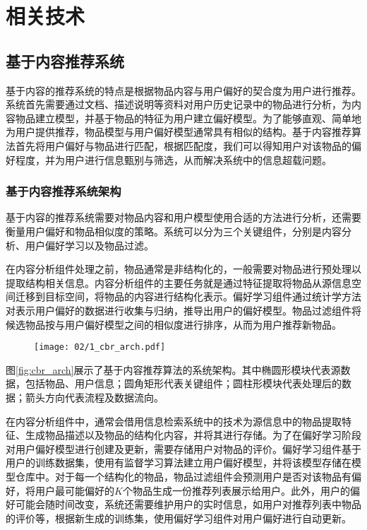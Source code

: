 \chapter{相关技术}
\label{chap:related}

\section{基于内容推荐系统}

基于内容的推荐系统的特点是根据物品内容与用户偏好的契合度为用户进行推荐\cite{lops2011content}。系统首先需要通过文档、描述说明等资料对用户历史记录中的物品进行分析，为内容物品建立模型，并基于物品的特征为用户建立偏好模型。为了能够直观、简单地为用户提供推荐，物品模型与用户偏好模型通常具有相似的结构。基于内容推荐算法首先将用户偏好与物品进行匹配，根据匹配度，我们可以得知用户对该物品的偏好程度，并为用户进行信息甄别与筛选，从而解决系统中的信息超载问题。

\subsection{基于内容推荐系统架构}
基于内容的推荐系统需要对物品内容和用户模型使用合适的方法进行分析，还需要衡量用户偏好和物品相似度的策略。系统可以分为三个关键组件，分别是内容分析、用户偏好学习以及物品过滤。

在内容分析组件处理之前，物品通常是非结构化的，一般需要对物品进行预处理以提取结构相关信息。内容分析组件的主要任务就是通过特征提取将物品从源信息空间迁移到目标空间，将物品的内容进行结构化表示。偏好学习组件通过统计学方法对表示用户偏好的数据进行收集与归纳，推导出用户的偏好模型。物品过滤组件将候选物品按与用户偏好模型之间的相似度进行排序，从而为用户推荐新物品\cite{herlocker2004evaluating}。

\begin{figure}
 \centering
 \texttt{[image: 02/1\_cbr\_arch.pdf]}
\end{figure}

图\ref{fig:cbr_arch}展示了基于内容推荐算法的系统架构。其中椭圆形模块代表源数据，包括物品、用户信息；圆角矩形代表关键组件；圆柱形模块代表处理后的数据；箭头方向代表流程及数据流向。

在内容分析组件中，通常会借用信息检索系统中的技术为源信息中的物品提取特征、生成物品描述以及物品的结构化内容，并将其进行存储。为了在偏好学习阶段对用户偏好模型进行创建及更新，需要存储用户对物品的评价。偏好学习组件基于用户的训练数据集，使用有监督学习算法建立用户偏好模型，并将该模型存储在模型仓库中。对于每一个结构化的物品，物品过滤组件会预测用户是否对该物品有偏好，将用户最可能偏好的$K$个物品生成一份推荐列表展示给用户。此外，用户的偏好可能会随时间改变，系统还需要维护用户的实时信息，如用户对推荐列表中物品的评价等，根据新生成的训练集，使用偏好学习组件对用户偏好进行自动更新。

